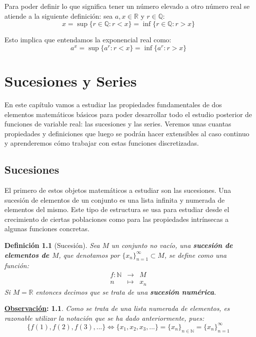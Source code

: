 \documentclass[10pt,a4paper,openright]{book}
\theoremstyle{break}
\newtheorem*{defi}{Definición}
\newtheorem*{obs}{\underline{Observación}:}
\begin{document}
Para poder definir lo que significa tener un número elevado a otro número real se atiende a la siguiente definición: sea $a,x\in \mathbb R$ y $r\in \mathbb Q$:
$$x=\sup\{r\in \mathbb Q: r<x\}=\inf\{r\in \mathbb Q: r>x\}$$

Esto implica que entendamos la exponencial real como:
$$a^x=\sup\{a^r: r<x\}=\inf\{a^r: r>x\}$$

\chapter{Sucesiones y Series}
En este capítulo vamos a estudiar las propiedades fundamentales de dos elementos matemáticos básicos para poder desarrollar todo el estudio posterior de funciones de variable real: las sucesiones y las series. Veremos unas cuantas propiedades y definiciones que luego se podrán hacer extensibles al caso continuo y aprenderemos cómo trabajar con estas funciones discretizadas.

\section{Sucesiones}
El primero de estos objetos matemáticos a estudiar son las sucesiones. Una sucesión de elementos de un conjunto es una lista infinita y numerada de elementos del mismo. Este tipo de estructura se usa para estudiar desde el crecimiento de ciertas poblaciones como para las propiedades intrínsecas a algunas funciones concretas.

\begin{defi}[Sucesión]
Sea $M$ un conjunto no vacío, una \textbf{sucesión de elementos de $M$}, que denotamos por $\{x_n\}_{n=1}^\infty\subset M$, se define como una función:
\begin{eqnarray*}
f: \mathbb N &\rightarrow& M \\
n &\longmapsto& x_n
\end{eqnarray*}
Si $M=\mathbb R$ entonces decimos que se trata de una \textbf{sucesión numérica}. 
\end{defi}

\begin{obs}
Como se trata de una lista numerada de elementos, es razonable utilizar la notación que se ha dado anteriormente, pues:
$$\{f(1),f(2),f(3), ...\}\Leftrightarrow \{x_1,x_2,x_3,...\}=\{x_n\}_{n\in \mathbb N}=\{x_n\}_{n=1}^{\infty}$$
\end{obs}
\end{document}
